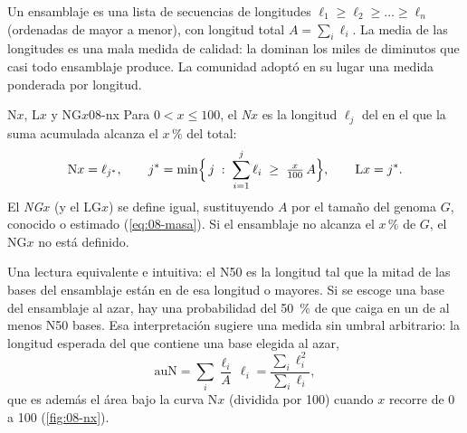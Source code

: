 Un ensamblaje es una lista de secuencias de longitudes $\ell_1\ge\ell_2\ge\dots\ge\ell_n$ (ordenadas de mayor a menor), con longitud total $A=\sum_i\ell_i$. La media de las longitudes es una mala medida de calidad: la dominan los miles de  diminutos que casi todo ensamblaje produce. La comunidad adoptó en su lugar una medida ponderada por longitud.

\begin{definicion}{N$x$, L$x$ y NG$x$}{08-nx}
Para $0<x\le100$, el \emph{N$x$} es la longitud $\ell_j$ del  en el que la suma acumulada alcanza el $x\,\%$ del total:
\begin{equation}\label{eq:08-nx}
\mathrm{N}x = \ell_{j^\ast},\qquad j^\ast = \min\Bigl\{\, j \;:\; \sum_{i=1}^{j}\ell_i \;\ge\; \tfrac{x}{100}\,A \Bigr\},
\qquad \mathrm{L}x = j^\ast .
\end{equation}
El \emph{NG$x$} (y el LG$x$) se define igual, sustituyendo $A$ por el tamaño del genoma $G$, conocido o estimado (\cref{eq:08-masa}). Si el ensamblaje no alcanza el $x\,\%$ de $G$, el NG$x$ no está definido.
\end{definicion}

\begin{simbolos}
\end{simbolos}

Una lectura equivalente e intuitiva: el N50 es la longitud tal que la mitad de las bases del ensamblaje están en  de esa longitud o mayores. Si se escoge una base del ensamblaje al azar, hay una probabilidad del \SI{50}{\percent} de que caiga en un  de al menos N50 bases. Esa interpretación sugiere una medida sin umbral arbitrario: la longitud esperada del  que contiene una base elegida al azar,
\begin{equation}\label{eq:08-aun}
\mathrm{auN} = \sum_{i}\frac{\ell_i}{A}\,\ell_i = \frac{\sum_i \ell_i^2}{\sum_i \ell_i},
\end{equation}
que es además el área bajo la curva N$x$ (dividida por 100) cuando $x$ recorre de 0 a 100 (\cref{fig:08-nx}).

\begin{simbolos}
\end{simbolos}

